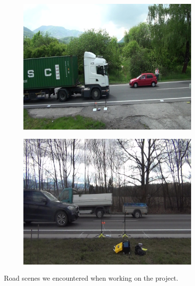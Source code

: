 \begin{figure}[!t]
    \centering
    \begin{subfigure}[b]{0.4\textwidth}
        \centering
        \includegraphics[width=\textwidth]{figures/siamese_tracking/interreg_sample_01.jpg}
        \caption[]{}
    \end{subfigure}
    \begin{subfigure}[b]{0.4\textwidth}
        \centering
        \includegraphics[width=\textwidth]{figures/siamese_tracking/interreg_sample_02.jpg}
        \caption[]{}
    \end{subfigure}
    \caption[Interreg dataset sample]{Road scenes we encountered when working on the \interreg{} project.}
    \label{fig:InterregDatasetSample}
\end{figure}

